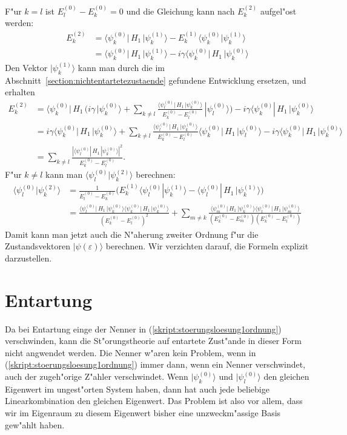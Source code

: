 F"ur $k=l$ ist $E_l^{(0)}-E_k^{(0)}=0$ und die Gleichung kann nach 
$E_k^{(2)}$ aufgel"ost werden:
\begin{align*}
E_k^{(2)}
&=
\langle\psi_k^{(0)}|\, H_1\, |\psi_k^{(1)}\rangle
-E_k^{(1)}\langle\psi_k^{(0)}|\psi_k^{(1)}\rangle
\\
&=
\langle\psi_k^{(0)}|\, H_1\, |\psi_k^{(1)}\rangle
-i\gamma
\langle \psi_k^{(0)}|\, H_1 \,|\psi_k^{(0)}\rangle
\end{align*}
Den Vektor $|\psi_k^{(1)}\rangle$ kann man durch die im
Abschnitt~\ref{section:nichtentartetezustaende} gefundene
Entwicklung ersetzen, und erhalten
\begin{align*}
E_k^{(2)}
&=
\langle\psi_k^{(0)}|\, H_1\,
\biggl(
i\gamma
\,|\psi_k^{(0)}\rangle
+
\sum_{k\ne l}
\frac{\langle \psi_l^{(0)}|\, H_1 \,|\psi_k^{(0)}\rangle}{E_k^{(0)}-E_l^{(0)}}
\,
|\psi_l^{(0)}\rangle
\biggr)
-i\gamma
\langle \psi_k^{(0)}|\, H_1 \,|\psi_k^{(0)}\rangle
\\
&=
i\gamma\langle\psi_k^{(0)}|\, H_1\, |\psi_k^{(0)}\rangle
+
\sum_{k\ne l}
\frac{\langle \psi_l^{(0)}|\, H_1 \,|\psi_k^{(0)}\rangle}{E_k^{(0)}-E_l^{(0)}}
\langle\psi_k^{(0)}|\, H_1 \,|\psi_l^{(0)}\rangle
-i\gamma
\langle \psi_k^{(0)}|\, H_1 \,|\psi_k^{(0)}\rangle
\\
&=
\sum_{k\ne l}
\frac{|\langle \psi_l^{(0)}|\, H_1 \,|\psi_k^{(0)}\rangle|^2}{E_k^{(0)}-E_l^{(0)}}.
\end{align*}
F"ur $k\ne l$ kann man $\langle\psi_l^{(0)}|\psi_k^{(2)}\rangle$ 
berechnen:
\begin{align*}
\langle\psi_l^{(0)}|\psi_k^{(2)}\rangle
&=
\frac1{E_l^{(0)}-E_k^{(0)}}\biggl(
E_k^{(1)}\langle\psi_l^{(0)}|\psi_k^{(1)}\rangle
-
\langle\psi_l^{(0)}|\,H_1\,|\psi_k^{(1)}\rangle
\biggr)
\\
&=
\frac{
\langle \psi_l^{(0)}|\, H_1 \,|\psi_k^{(0)}\rangle
\langle \psi_k^{(0)}|\, H_1 \,|\psi_k^{(0)}\rangle
}{
(E_k^{(0)}-E_l^{(0)})^2
}
+
\sum_{m\ne k}
\frac{\langle \psi_m^{(0)}|\, H_1 \,|\psi_k^{(0)}\rangle
\langle\psi_l^{(0)}|\, H_1 \,|\psi_m^{(0)}\rangle
}{
(E_k^{(0)}-E_m^{(0)})
(E_k^{(0)}-E_l^{(0)})
}
\end{align*}
Damit kann man jetzt auch die N"aherung zweiter Ordnung
f"ur die Zustandsvektoren $|\psi(\varepsilon)\rangle$
berechnen.
Wir verzichten darauf, die Formeln explizit darzustellen.

\section{Entartung}
Da bei Entartung einge der Nenner in (\ref{skript:stoerungsloesung1ordnung})
verschwinden, kann die St"orungstheorie auf entartete Zust"ande
in dieser Form nicht angwendet werden.
Die Nenner w"aren kein Problem, wenn in (\ref{skript:stoerungsloesung1ordnung})
immer dann, wenn ein Nenner verschwindet, auch der zugeh"orige Z"ahler
verschwindet.
Wenn $|\psi_k^{(0)}\rangle$ und $|\psi_l^{(0)}\rangle$ den gleichen
Eigenwert im ungest"orten System haben, dann hat auch jede beliebige
Linearkombination den gleichen Eigenwert.
Das Problem ist also vor allem, dass wir im Eigenraum zu diesem
Eigenwert bisher eine unzweckm"assige Basis gew"ahlt haben.

